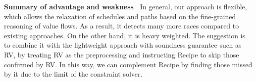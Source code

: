 {\bf Summary of advantage and weakness\ } In general, our approach is flexible, which allows the relaxation of schedules and paths based on the fine-grained reasoning of value flows. As a result, it detects many more races compared to existing approaches. On the other hand, it is heavy weighted. The suggestion is to combine it with the lightweight approach with soundness guarantee such as {\sf RV}, by treating {\sf RV} as the preprocessing and instructing {\sf Recipe} to skip those confirmed by {\sf RV}. In this way, we can complement {\sf Recipe} by finding those missed by it due to the limit of the constraint solver.
 













